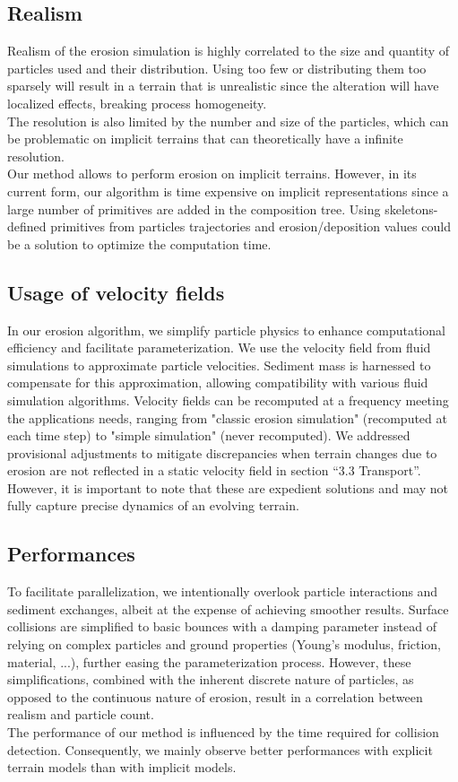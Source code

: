 \subsection{Realism}
Realism of the erosion simulation is highly correlated to the size and quantity of particles used and their distribution. Using too few or distributing them too sparsely will result in a terrain that is unrealistic since the alteration will have localized effects, breaking process homogeneity. \\ 
The resolution is also limited by the number and size of the particles, which can be problematic on implicit terrains that can theoretically have a infinite resolution.\\
Our method allows to perform erosion on implicit terrains. However, in its current form, our algorithm is time expensive on implicit representations since a large number of primitives are added in the composition tree. Using skeletons-defined primitives \cite{Hong2013, Rigaudiere2000}%
 from particles trajectories and erosion/deposition values could be a solution to optimize the computation time.

\subsection{Usage of velocity fields}
In our erosion algorithm, we simplify particle physics to enhance computational efficiency and facilitate parameterization. We use the velocity field from fluid simulations to approximate particle velocities. Sediment mass is harnessed to compensate for this approximation, allowing compatibility with various fluid simulation algorithms. Velocity fields can be recomputed at a frequency meeting the applications needs, ranging from "classic erosion simulation" (recomputed at each time step) to "simple simulation" (never recomputed). We addressed provisional adjustments to mitigate discrepancies when terrain changes due to erosion are not reflected in a static velocity field in section “3.3 Transport”. However, it is important to note that these are expedient solutions and may not fully capture precise dynamics of an evolving terrain. 

\subsection{Performances}
To facilitate parallelization, we intentionally overlook particle interactions and sediment exchanges, albeit at the expense of achieving smoother results. Surface collisions are simplified to basic bounces with a damping parameter instead of relying on complex particles and ground properties (Young's modulus, friction, material, ...)\cite{Yan2020}, further easing the parameterization process. However, these simplifications, combined with the inherent discrete nature of particles, as opposed to the continuous nature of erosion, result in a correlation between realism and particle count. \\
The performance of our method is influenced by the time required for collision detection. Consequently, we mainly observe better performances with explicit terrain models than with implicit models. 

